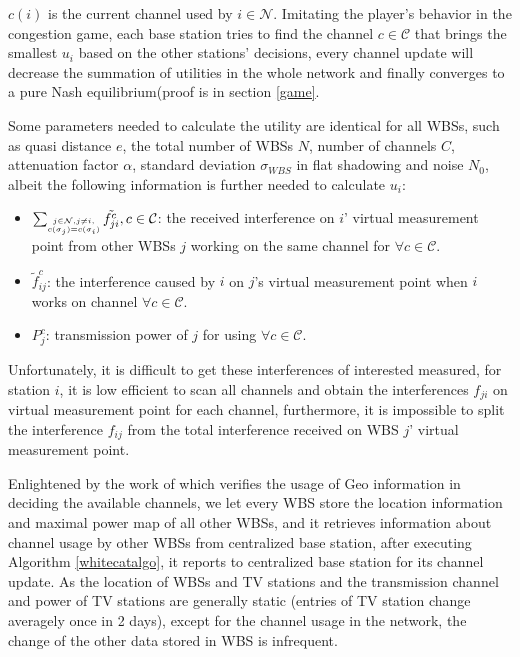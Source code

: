 $c(i)$ is the current channel used by $i\in \mathcal{N}$. Imitating the player's behavior in the congestion game, each base station tries to find the channel $c\in \mathcal{C}$ that brings the smallest $u_i$ based on the other stations' decisions, every channel update will decrease the summation of utilities in the whole network and finally converges to a pure Nash equilibrium(proof is in section \ref{game}.


Some parameters needed to calculate the utility are identical for all WBSs, such as quasi distance $e$, the total number of WBSs $N$, number of channels $C$, attenuation factor $\alpha$, standard deviation $\sigma_{WBS}$ in flat shadowing and noise $N_0$, albeit the following information is further needed to calculate $u_i$: 
	\begin{itemize} %
	\item $\sum_{\tiny\substack{j\in \mathcal{N}, j\ne i,\\ c(\sigma_j)=c(\sigma_i)}}\tilde{f_{ji}^c}, c\in \mathcal{C}$: the received interference on $i$' virtual measurement point from other WBSs $j$ working on the same channel for $\forall c\in \mathcal{C}$.
	\item $\tilde f_{ij}^c$: the interference caused by $i$ on $j$'s virtual measurement point when $i$ works on channel $\forall c\in \mathcal{C}$.
	\item $P_j^c$: transmission power of $j$ for using $\forall c\in \mathcal{C}$.
	\end{itemize}
Unfortunately, it is difficult to get these interferences of interested measured, for station $i$, it is low efficient to scan all channels and obtain the interferences $f_{ji}$ on virtual measurement point for each channel, furthermore, it is impossible to split the interference $f_{ij}$ from the total interference received on WBS $j$' virtual measurement point. 

Enlightened by the work of \cite{SenseLess2011} which verifies the usage of Geo information in deciding the available channels, we let every WBS store the location information and maximal power map of all other WBSs, and it retrieves information about channel usage by other WBSs from centralized base station, after executing Algorithm \ref{whitecatalgo}, it reports to centralized base station for its channel update. As the location of WBSs and TV stations and the transmission channel and power of TV stations are generally static (entries of TV station change averagely once in 2 days\cite{SenseLess2011}), except for the channel usage in the network, the change of the other data stored in WBS is infrequent. 


